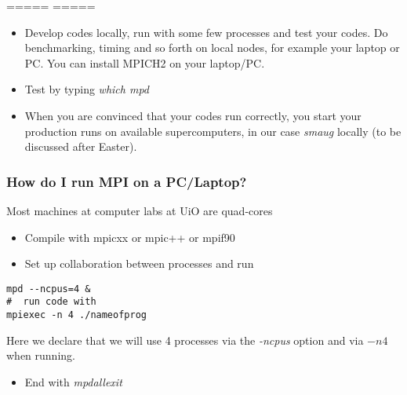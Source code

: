 \documentclass{beamer}
\begin{document}
\begin{frame}

=====  =====
\begin{block}{}
\begin{itemize}
\item Develop codes locally, run with some few processes and test your codes.  Do benchmarking, timing and so forth on local nodes, for example your laptop or PC.  You can install MPICH2 on  your laptop/PC. 

\item Test by typing \emph{which mpd}

\item When you are convinced that your codes run correctly, you start your production runs on available supercomputers, in our case \emph{smaug} locally (to be discussed after Easter).
\end{itemize}

\noindent
\end{block}
\end{frame}

\begin{frame}
\frametitle{How do I run MPI on a PC/Laptop?}

\begin{block}{}
Most machines at computer labs at UiO are quad-cores
\begin{itemize}
\item Compile with mpicxx or mpic++ or mpif90

\item Set up collaboration between processes and run 
\end{itemize}

\noindent
\begin{verbatim}
mpd --ncpus=4 &
#  run code with
mpiexec -n 4 ./nameofprog
\end{verbatim}
Here we declare that we will use 4 processes via the \emph{-ncpus} option and via $-n 4$ when running.
\begin{itemize}
\item End with \emph{mpdallexit}
\end{itemize}

\noindent
\end{block}
\end{frame}
\end{document}
